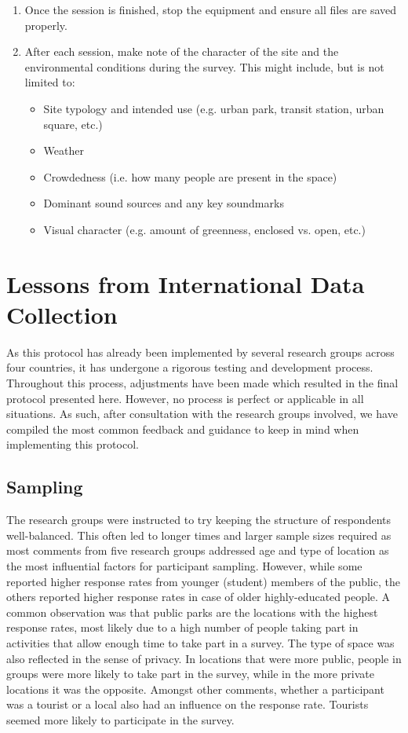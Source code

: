 \begin{enumerate}
     \item Once the session is finished, stop the equipment and ensure all files are saved properly.
     \item After each session, make note of the character of the site and the environmental conditions during the survey. This might include, but is not limited to:
           \begin{itemize}
             \item Site typology and intended use (e.g. urban park, transit station, urban square, etc.)
             \item Weather
             \item Crowdedness (i.e. how many people are present in the space)
             \item Dominant sound sources and any key soundmarks
             \item Visual character (e.g. amount of greenness, enclosed vs. open, etc.)
           \end{itemize}
   \end{enumerate}

\section{Lessons from International Data Collection}

 As this protocol has already been implemented by several research groups across four countries, it has undergone a rigorous testing and development process. Throughout this process, adjustments have been made which resulted in the final protocol presented here. However, no process is perfect or applicable in all situations. As such, after consultation with the research groups involved, we have compiled the most common feedback and guidance to keep in mind when implementing this protocol.

 \subsection{Sampling}

   The research groups were instructed to try keeping the structure of respondents well-balanced. This often led to longer times and larger sample sizes required as most comments from five research groups addressed age and type of location as the most influential factors for participant sampling. However, while some reported higher response rates from younger (student) members of the public, the others reported higher response rates in case of older highly-educated people. A common observation was that public parks are the locations with the highest response rates, most likely due to a high number of people taking part in activities that allow enough time to take part in a survey. The type of space was also reflected in the sense of privacy. In locations that were more public, people in groups were more likely to take part in the survey, while in the more private locations it was the opposite. Amongst other comments, whether a participant was a tourist or a local also had an influence on the response rate. Tourists seemed more likely to participate in the survey.

